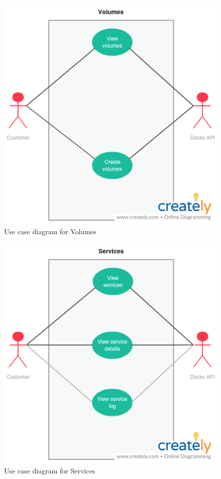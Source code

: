 \documentclass[]{article}
\begin{document}
\begin{figure}[H]
	\centering
	\includegraphics[scale=0.5]{uml/volumes.png}
	\caption{Use case diagram for  Volumes}
\end{figure}

\begin{figure}[H]
	\centering
	\includegraphics[scale=0.5]{uml/services.png}
	\caption{Use case diagram for  Services}
\end{figure}
\end{document}
